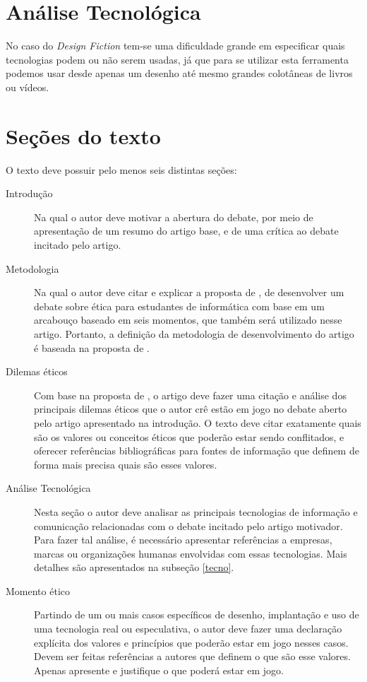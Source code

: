 \documentclass[12pt]{article}
\begin{document}
	\section{\label{artigo:Analise}Análise Tecnológica}
	No caso do \textit{Design Fiction} tem-se uma dificuldade grande em especificar quais tecnologias podem ou não serem usadas, já que para se utilizar esta ferramenta podemos usar desde apenas um desenho até mesmo grandes colotâneas de livros ou vídeos.

	\section{\label{secoes:texto}Seções do texto}

	O texto deve possuir pelo menos seis distintas seções:
	\begin{description}
		\item [Introdução] Na qual o autor deve motivar a abertura do debate, por meio de apresentação de um resumo do artigo base, e de uma crítica ao debate incitado pelo artigo.
		\item [Metodologia] Na qual o autor deve citar e explicar a proposta de \citet{jones_doing_2016}, de desenvolver um debate sobre ética para estudantes de informática com base em um arcabouço baseado em seis momentos, que também será utilizado nesse artigo. Portanto, a definição da metodologia de desenvolvimento do artigo é baseada na proposta de \citet{jones_doing_2016}.
		\item [Dilemas éticos] Com base na proposta de \citet{jones_doing_2016}, o artigo deve fazer uma citação e análise dos principais dilemas éticos que o autor crê estão em jogo no debate aberto pelo artigo apresentado na introdução. O texto deve citar exatamente quais são os valores ou conceitos éticos que poderão estar sendo conflitados, e oferecer referências bibliográficas para fontes de informação que definem de forma mais precisa quais são esses valores.
		\item [Análise Tecnológica] Nesta seção o autor deve analisar as principais tecnologias de informação e comunicação relacionadas com o debate incitado pelo artigo motivador. Para fazer tal análise, é necessário apresentar referências a empresas, marcas ou organizações humanas envolvidas com essas tecnologias. Mais detalhes são apresentados na subseção \ref{tecno}.
		\item [Momento ético] Partindo de um ou mais casos específicos de desenho, implantação e uso de uma tecnologia real ou especulativa, o autor deve fazer uma declaração explícita dos valores e princípios que poderão estar em jogo nesses casos. Devem ser feitas referências a autores que definem o que são esse valores. Apenas apresente e justifique o que poderá estar em jogo.

\end{description}
\end{document}
